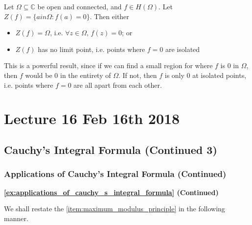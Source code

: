 \documentclass[11pt, oneside]{book}
\begin{document}
\begin{lemma}\label{lemma:principle_of_analytic_continuation}
	Let $\Omega \subseteq \mathbb{C}$ be open and connected, and $f \in H(\Omega)$. Let $Z(f) = \{a in \Omega : f(a) = 0 \}$. Then either
	\begin{itemize}
		\item $Z(f) = \Omega$, i.e. $\forall z \in \Omega, \, f(z) = 0$; or
		\item $Z(f)$ has no limit point, i.e. points where $f = 0$ are isolated
	\end{itemize}
\end{lemma}

This is a powerful result, since if we can find a small region for where $f$ is $0$ in $\Omega$, then $f$ would be $0$ in the entirety of $\Omega$. If not, then $f$ is only $0$ at isolated points, i.e. points where $f = 0$ are all apart from each other.




\chapter{Lecture 16 Feb 16th 2018}
	\label{chapter:lecture_16_feb_16th_2018}

\section{Cauchy's Integral Formula (Continued 3)} %
\label{sec:cauchy_s_integral_formula_continued_3}

\subsection{Applications of Cauchy's Integral Formula (Continued)} %
\label{sub:applications_of_cauchy_s_integral_formula_continued}

\textbf{\cref{ex:applications_of_cauchy_s_integral_formula} (Continued)}

We shall restate the \cref{item:maximum_modulus_principle} in the following manner.
\end{document}
